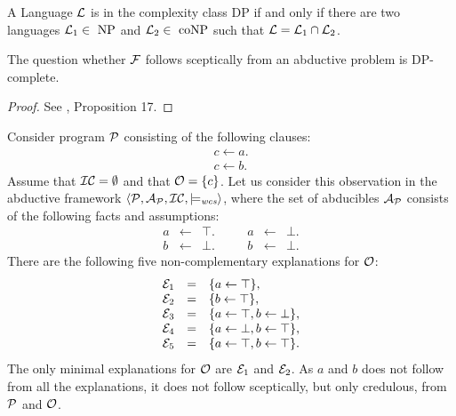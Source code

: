 \begin{definition}
\label{def:dp}
\normalfont
 A Language $\mathcal{L}$ is in the complexity class DP if and only if there are two languages $\mathcal{L}_1 \in \mbox{ NP}$ and $\mathcal{L}_2 \in \mbox{ coNP}$ such that $\mathcal{L} = \mathcal{L}_1 \cap \mathcal{L}_2$.
\end{definition}

\begin{prop}
\label{prop:hasexp}
\normalfont
The question whether $\mathcal{F}$ follows sceptically from an abductive problem is DP-complete.
\begin{proof}
See \cite{saldanha1872contextual}, Proposition 17.
\end{proof}
\end{prop}

\newpage
\vspace*{\fill}
\begin{tcolorbox}
\begin{example}
\label{example:abduction}
\normalfont
Consider program $\mathcal{P}$ consisting of the following clauses:
\[
\begin{array}{lcl}
c \leftarrow a. \\
c \leftarrow b.
\end{array}
\]
Assume that ${\cal IC} = \emptyset$ and that $\mathcal{O} = \{c\}$. Let us consider this observation in the abductive framework $\langle \mathcal{P}, \mathcal{A}_{\mathcal{P}}, {\cal IC}, \models_{\normalfont\textit{wcs}}\rangle$, where the set of abducibles $\mathcal{A}_{\mathcal{P}}$ consists of the following facts and assumptions:
\[
\begin{array}{ccccccc}
a &\leftarrow& \top. &\quad& a &\leftarrow& \bot.\\
b &\leftarrow& \bot. &\quad& b &\leftarrow& \bot.
\end{array}
\]
There are the following five non-complementary explanations for $\mathcal{O}$:
\[
\begin{array}{lcl}
\mathcal{E}_1 &=& \{a\leftarrow \top\}, \\
\mathcal{E}_2 &=& \{b \leftarrow \top\}, \\
\mathcal{E}_3 &=& \{a \leftarrow \top, b \leftarrow \bot\}, \\
\mathcal{E}_4 &=& \{a \leftarrow \bot, b \leftarrow \top\}, \\
\mathcal{E}_5 &=& \{a \leftarrow \top, b \leftarrow \top\}.
\end{array}
\]
The only minimal explanations for $\mathcal{O}$ are $\mathcal{E}_1$ and $\mathcal{E}_2$. As $a$ and $b$ does not follow from all the explanations, it does not follow sceptically, but only credulous, from $\mathcal{P}$ and $\mathcal{O}$. \\

\end{example}
\end{tcolorbox}
